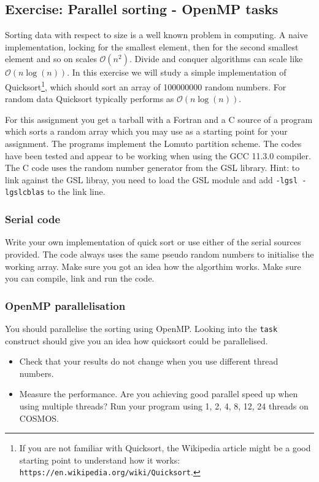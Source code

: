 \subsection{Exercise: Parallel sorting - OpenMP tasks}

Sorting data with respect to size is a well known problem in computing.  A naive implementation, locking for the smallest element, then for the second smallest element and so on scales ${\mathcal O}(n^2)$.  Divide and conquer algorithms can scale like ${\mathcal O}(n \log(n))$.   In this exercise we will study a simple implementation of Quicksort\footnote{If you are not familiar with Quicksort, the Wikipedia article might be a good starting point to understand how it works:  \texttt{https://en.wikipedia.org/wiki/Quicksort}.

 }, which should sort an array of 100000000 random numbers.  For random data Quicksort typically performs as ${\mathcal O}(n \log(n))$.

For this assignment you get a tarball with a Fortran and a C source of a program which sorts a random array which you may use as a starting point for your assignment.   The programs implement the Lomuto partition scheme.  The codes have been tested and appear to be working when using the GCC 11.3.0 compiler.   The C code uses the random number generator from the GSL library.  Hint: to link against the GSL libray, you need to load the GSL module and add \verb+-lgsl -lgslcblas+ to the link line.

\subsubsection{Serial code}
Write your own implementation of quick sort or use either of the serial sources provided. The code always uses the same pseudo random numbers to initialise the working array.  Make sure you got an idea how the algorthim works.  Make sure you can compile, link and run the code.  

\subsubsection{OpenMP parallelisation}
You should parallelise the sorting using OpenMP. Looking into the \verb+task+ construct should give you an idea how quicksort could be parallelised.
\begin{itemize}
\item Check that your results do not change when you use different thread numbers.
\item Measure the performance.  Are you achieving good parallel speed up when using multiple threads?  Run your program using 1, 2, 4, 8, 12, 24 threads on COSMOS.  
\end{itemize}


